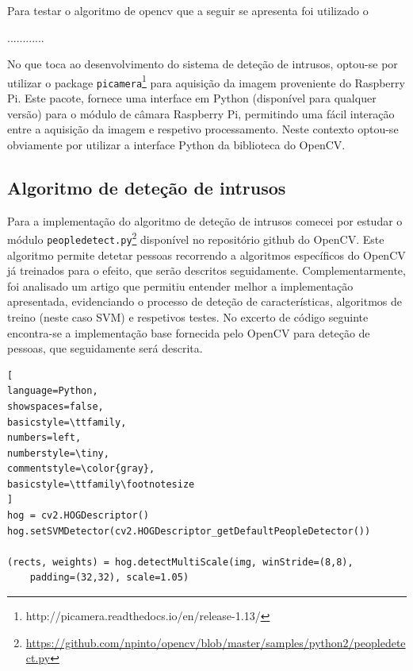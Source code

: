 Para testar o algoritmo de opencv que a seguir se apresenta foi utilizado o

............





No que toca ao desenvolvimento do sistema de deteção de intrusos, optou-se por utilizar o package \texttt{picamera}\footnote{http://picamera.readthedocs.io/en/release-1.13/} para aquisição da imagem proveniente do Raspberry Pi. Este pacote, fornece  uma interface em Python (disponível para qualquer versão) para o módulo de câmara Raspberry Pi, permitindo uma fácil interação entre a aquisição da imagem e respetivo processamento. Neste contexto optou-se obviamente por utilizar a interface Python da biblioteca do OpenCV.



\subsection{Algoritmo de deteção de intrusos}


Para a implementação do algoritmo de deteção de intrusos comecei por estudar o módulo \texttt{peopledetect.py}\footnote{\url{https://github.com/npinto/opencv/blob/master/samples/python2/peopledetect.py}} disponível no repositório github do OpenCV. Este algoritmo permite detetar pessoas recorrendo a algoritmos específicos do OpenCV já treinados para o efeito, que serão descritos seguidamente. Complementarmente, foi analisado um artigo\cite{Dalal} que permitiu entender melhor a implementação apresentada, evidenciando o processo de deteção de características, algoritmos de treino (neste caso \ac{SVM}) e respetivos testes. No excerto de código seguinte encontra-se a implementação base fornecida pelo OpenCV para deteção de pessoas, que seguidamente será descrita. 

\begin{lstlisting}[
language=Python,
showspaces=false,
basicstyle=\ttfamily,
numbers=left,
numberstyle=\tiny,
commentstyle=\color{gray},
basicstyle=\ttfamily\footnotesize
]
hog = cv2.HOGDescriptor()
hog.setSVMDetector(cv2.HOGDescriptor_getDefaultPeopleDetector())

(rects, weights) = hog.detectMultiScale(img, winStride=(8,8), 
	padding=(32,32), scale=1.05)
\end{lstlisting}
	

